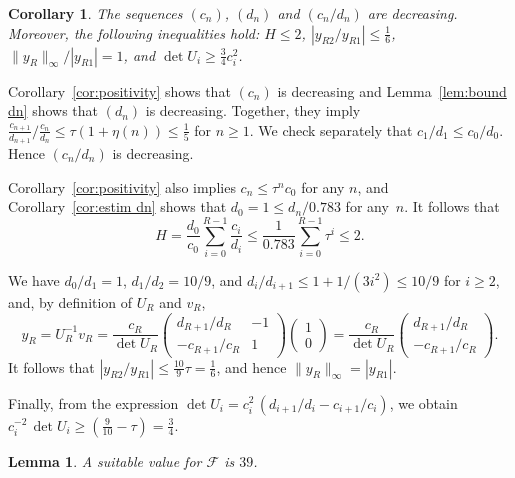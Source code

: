 \documentclass[10pt, conference]{IEEEtran}
\renewcommand{\Phi}{\mathcal{F}}
\newtheorem{corollary}{Corollary}
\newtheorem{lemma}{Lemma}
\begin{document}
\begin{corollary} \mightbeomitted
  \label{cor:ineqs for MvdS}
  The sequences $(c_n)$, $(d_n)$ and $(c_n/d_n)$ are decreasing. Moreover, the following inequalities hold: $H \le 2$, $|y_{R2}/y_{R1}| \le \frac16$, $\|y_R\|_{\infty}/|y_{R1}| = 1$, and $\det U_i \ge \frac34 c_i^2$.
\end{corollary}
\begin{IEEEproof}
  Corollary~\ref{cor:positivity} shows that $(c_n)$ is decreasing and Lemma~\ref{lem:bound dn} shows that $(d_n)$ is decreasing. Together, they imply
$
  \frac{c_{n+1}}{d_{n+1}} / \frac{c_n}{d_n}
  \leq \tau (1 + \eta(n))
  \leq \frac{1}{5}
$ for $n \geq 1$. We check separately that $c_1/d_1 \leq c_0/d_0$.
Hence $(c_n/d_n)$ is decreasing.

Corollary~\ref{cor:positivity} also implies $c_n \le \tau^n c_0$ for any $n$, and Corollary~\ref{cor:estim dn} shows that $d_0 = 1 \le d_n/0.783$ for any~$n$.
It follows that
\[ H = \frac{d_0}{c_0} \sum_{i=0}^{R-1} \frac{c_i}{d_i} \le \frac{1}{0.783} \sum_{i=0}^{R-1} \tau^i \le 2. \]

We have $d_0/d_1 = 1$, $d_1/d_2 = 10/9$, and
$d_i/d_{i+1} \le 1+1/(3i^2) \le 10/9$
for $i \geq 2$,
and, by definition of $U_R$ and $v_R$,
\setlength{\arraycolsep}{2pt}
\[
  y_R = U_R^{-1} v_R =
  \frac{c_R}{\det U_R}
  \begin{pmatrix}
    d_{R+1}/d_R & -1\\
    -c_{R+1}/c_R &  1
  \end{pmatrix}
  \begin{pmatrix}
    1 \\ 0
  \end{pmatrix}
  =
  \frac{c_R}{\det U_R}
  \begin{pmatrix}
    d_{R+1}/d_R \\ -c_{R+1}/{c_R}
  \end{pmatrix}.
\]
It follows that
$|y_{R2}/y_{R1}| \le \frac{10}{9} \tau = \frac16$,
and hence
$\|y_R\|_{\infty} = |y_{R1}|$.

Finally, from the expression $\det U_i = c_i^2\,(d_{i+1}/d_i - c_{i+1}/c_i)$, we obtain $c_i^{-2}\, \det U_i \geq (\frac{9}{10} - \tau) = \frac34$.
\end{IEEEproof}
\begin{lemma}
A suitable value for $\Phi$ is $39$.
\end{lemma}
\end{document}
